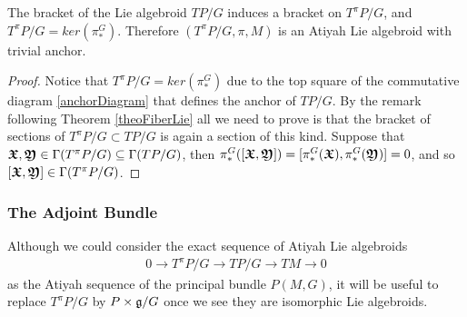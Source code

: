 \begin{theorem}
The bracket of the Lie algebroid $TP/G$ induces a bracket on $T^\pi P/G$, and $T^\pi P/G = ker(\pi_*^G)$. Therefore $(T^\pi P/G, \pi, M)$ is an Atiyah Lie algebroid with trivial anchor.
\end{theorem}

\begin{proof}
Notice that $T^\pi P/G = ker(\pi_*^G)$ due to the top square of the commutative diagram \ref{anchorDiagram} that defines the anchor of $TP/G$. By the remark following Theorem \ref{theoFiberLie} all we need to prove is that the bracket of sections of $T^\pi P/G \subset TP/G$ is again a section of this kind. Suppose that $\bm{\mathfrak{X}}, \bm{\mathfrak{Y}} \in \Gamma(T^\pi P/G) \subseteq \Gamma(TP/G)$, then $\pi_*^G([\bm{\mathfrak{X}}, \bm{\mathfrak{Y}}]) = [\pi_*^G (\bm{\mathfrak{X}}), \pi_*^G(\bm{\mathfrak{Y}})] \\= 0$, and so $[\bm{\mathfrak{X}}, \bm{\mathfrak{Y}}] \in \Gamma(T^\pi P/G)$. 
\end{proof}

\subsubsection{The Adjoint Bundle}

Although we could consider the exact sequence of Atiyah Lie algebroids
\begin{align*}
    0 \to T^\pi P/G \to TP/G \to TM \to 0
\end{align*}
as the Atiyah sequence of the principal bundle $P(M, G)$, it will be useful to replace $T^\pi P/G$ by $P \times \mathfrak{g}/G$ once we see they are isomorphic Lie algebroids.


